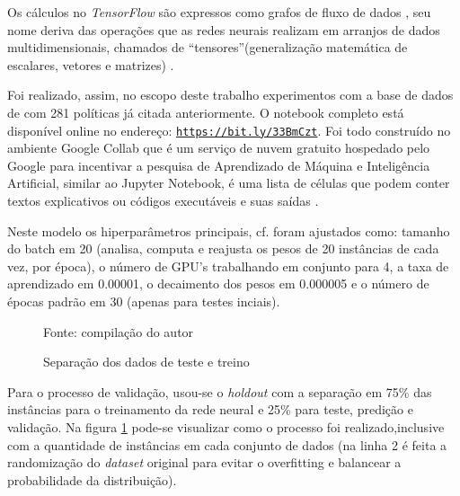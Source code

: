 Os cálculos no \textit{TensorFlow} são expressos como grafos de fluxo de dados , seu nome deriva das operações que as redes neurais realizam em arranjos de dados multidimensionais, chamados de ``tensores''(generalização matemática de escalares, vetores e matrizes) \cite{kadimisetty_tensorflow_2018}.

Foi realizado, assim, no escopo deste trabalho experimentos com a base de dados de com 281 políticas já citada anteriormente. O notebook completo está disponível online no endereço: \underline{\texttt{https://bit.ly/33BmCzt}}. Foi todo construído no ambiente Google Collab que é um serviço de nuvem gratuito hospedado pelo Google para incentivar a pesquisa de Aprendizado de Máquina e Inteligência Artificial, similar ao Jupyter Notebook, é uma lista de células que podem conter textos explicativos ou códigos executáveis e suas saídas \cite{collab_2020}.

Neste modelo os hiperparâmetros principais, cf.  foram ajustados como: tamanho do batch em 20 (analisa, computa e reajusta os pesos de 20 instâncias de cada vez, por época), o número de GPU's trabalhando em conjunto para 4, a taxa de aprendizado em 0.00001, o decaimento dos pesos em 0.000005 e o número de épocas padrão em 30 (apenas para testes inciais).

\begin{figure}[h!]
	\centering
	\caption{Separação dos dados de teste e treino}
	
	\label{fig:separacao-teste-treino}
	{\scriptsize Fonte: compilação do autor}
\end{figure}

Para o processo de validação, usou-se o \textit{holdout} com a separação em 75\% das instâncias para o treinamento da rede neural e 25\% para teste, predição e validação. Na figura \ref{fig:separacao-teste-treino} pode-se visualizar como o processo foi realizado,inclusive com a quantidade de instâncias em cada conjunto de dados (na linha 2 é feita a randomização do \textit{dataset} original para evitar o overfitting e balancear a probabilidade da distribuição).

